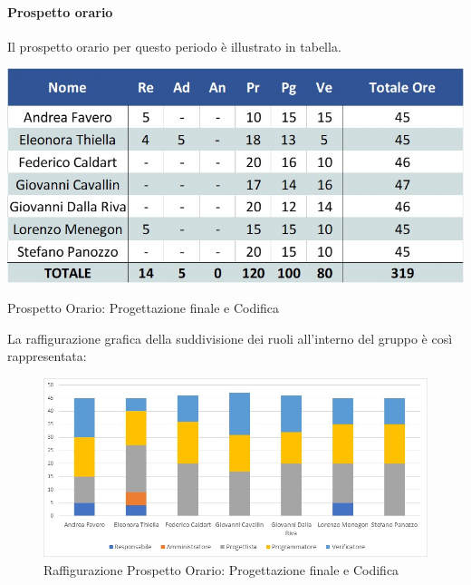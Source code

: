 \paragraph{Prospetto orario}
Il prospetto orario per questo periodo è illustrato in tabella.
\begin{table}[H]
	\centerline{\includegraphics[scale=0.7]{img/Preventivo/ProgettazioneFinaleCodificaOrario.jpg}}
	\caption{Prospetto Orario: Progettazione finale e Codifica}
	\clearpage
\end{table}
La raffigurazione grafica della suddivisione dei ruoli all'interno del gruppo è così rappresentata: 
\begin{figure}[H]
	\centerline{\includegraphics[scale=0.85]{img/Preventivo/Istogrammi/ProgettazioneFinaleCodifica.jpg}}
	\caption{Raffigurazione Prospetto Orario: Progettazione finale e Codifica}
	\clearpage
\end{figure}
\newpage

